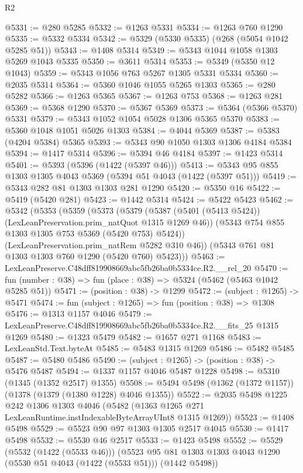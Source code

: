 \begin{lexlean}{R2}
\begin{coremodule}
@5331 := @280 @5285
@5332 := @1263 @5331
@5334 := @1263 @760 @1290
@5335 := @5332 @5334
@5342 := @5329 (@5330 @5335) (@268 (@5054 @1042 @5285 @51))
@5343 := @1408 @5314
@5349 := @5343 @1044 @1058 @1303 @5269 @1043 @5335
@5350 := @3611 @5314
@5353 := @5349 (@5350 @12 @1043)
@5359 := @5343 @1056 @763 @5267 @1305 @5331 @5334
@5360 := @2035 @5314
@5364 := @5360 @1046 @1055 @5265 @1303
@5365 := @280 @5282
@5366 := @1263 @5365
@5367 := @1263 @753
@5368 := @1263 @281
@5369 := @5368 @1290
@5370 := @5367 @5369
@5373 := @5364 (@5366 @5370) @5331
@5379 := @5343 @1052 @1054 @5028 @1306 @5365 @5370
@5383 := @5360 @1048 @1051 @5026 @1303
@5384 := @4044 @5369
@5387 := @5383 (@4204 @5384) @5365
@5393 := @5343 @90 @1050 @1303 @1306 @4184 @5384
@5394 := @1417 @5314
@5396 := @5394 @46 @4184
@5397 := @1423 @5314
@5401 := @5393 (@5396 (@1422 (@5397 @46)))
@5413 := @5343 @95 @855 @1303 @1305 @4043 @5369 (@5394 @51 @4043 (@1422 (@5397 @51)))
@5419 := @5343 @282 @81 @1303 @1303 @281 @1290
@5420 := @5350 @16
@5422 := @5419 (@5420 @281)
@5423 := @1442 @5314
@5424 := @5422 @5423
@5462 := @5342
    (@5353
      (@5359
        (@5373
          (@5379
            (@5387 (@5401 (@5413 @5424)) (LexLeanPreservation.prim_natQuot @1315 @1269 @46))
            (@5343 @754 @855 @1303 @1305 @753 @5369 (@5420 @753) @5424))
          (LexLeanPreservation.prim_natRem @5282 @310 @46))
        (@5343 @761 @81 @1303 @1303 @760 @1290 (@5420 @760) @5423)))
@5463 := LexLeanPreserve.C48dff819908669abc5fb26ba0b5334ce.R2.__rel_20
@5470 := fun (number : @38) => fun (place : @38) => @5324 (@5462 (@5463 @1042 @5285 @51))
@5471 := (position : @38) -> @1299
@5472 := (subject : @1265) -> @5471
@5474 := fun (subject : @1265) => fun (position : @38) => @1308
@5476 := @1313 @1157 @4046
@5479 := LexLeanPreserve.C48dff819908669abc5fb26ba0b5334ce.R2.__fits_25 @1315 @1269
@5480 := @1323 @5479
@5482 := @1657 @271 @1168
@5483 := LexLeanStd.Text.byteAt
@5485 := @5483 @1315 @1269
@5486 := @5482 @5485
@5487 := @5480 @5486
@5490 := (subject : @1265) -> (position : @38) -> @5476 @5487
@5494 := @1337 @1157 @4046 @5487 @1228
@5498 := @5310 (@1345 (@1352 @2517) @1355)
@5508 := @5494 @5498 (@1362 (@1372 @1157)) (@1378 (@1379 (@1380 @1228) @4046 @1355))
@5522 := @2035
    @5498
    @1225
    @242
    @1306
    @1303
    @4046
    (@5482 (@1363 @1265 @271 LexLeanRuntime.instIndexableByteArrayUInt8 @1315 @1269))
@5523 := @1408 @5498
@5529 := @5523 @90 @97 @1303 @1305 @2517 @4045
@5530 := @1417 @5498
@5532 := @5530 @46 @2517
@5533 := @1423 @5498
@5552 := @5529
    (@5532 (@1422 (@5533 @46)))
    (@5523 @95 @81 @1303 @1303 @4043 @1290 (@5530 @51 @4043 (@1422 (@5533 @51))) (@1442 @5498))

\end{coremodule}
\end{lexlean}

